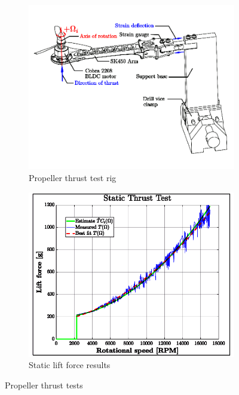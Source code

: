 \begin{figure}[htbp]
\centering
\begin{subfigure}{0.49\textwidth}
\centering
\includegraphics[width=\textwidth]{figs/thrust-rig}
\vspace{-10pt}
\caption{Propeller thrust test rig}
\label{fig:thrust-rig}
\end{subfigure}
\begin{subfigure}{0.49\textwidth}
\centering
\includegraphics[width=\textwidth]{graphs/thrust-plot}
\vspace{-10pt}
\caption{Static lift force results}
\label{fig:thrust-plot}
\end{subfigure}
\vspace{-4pt}
\caption{Propeller thrust tests}
\label{fig:thrusts}
\end{figure}
